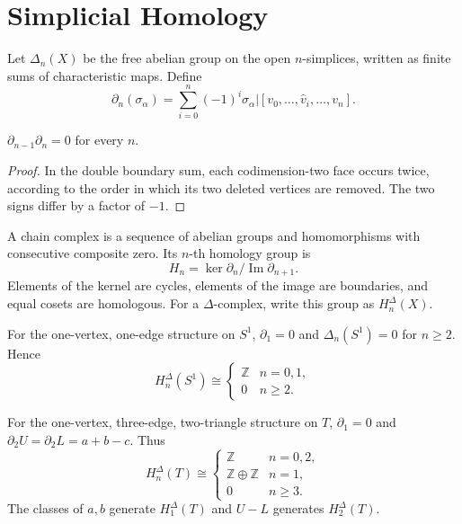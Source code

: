 \section*{Simplicial Homology}

Let $\Delta_n(X)$ be the free abelian group on the open $n$-simplices, written as finite sums of characteristic maps.  Define
\[
\partial_n(\sigma_\alpha)=\sum_{i=0}^n(-1)^i\sigma_\alpha|[v_0,\ldots,\widehat v_i,\ldots,v_n].
\]

\begin{lemma}
\label{lem:boundary-composition-zero}

$\partial_{n-1}\partial_n=0$ for every $n$.
\end{lemma}
\begin{proof}
\sketch In the double boundary sum, each codimension-two face occurs twice, according to the order in which its two deleted vertices are removed.  The two signs differ by a factor of $-1$.
\end{proof}

A chain complex is a sequence of abelian groups and homomorphisms with consecutive composite zero.  Its $n$-th homology group is
\[
H_n=\ker\partial_n/\operatorname{Im}\partial_{n+1}.
\]
Elements of the kernel are cycles, elements of the image are boundaries, and equal cosets are homologous.  For a $\Delta$-complex, write this group as $H_n^\Delta(X)$.

\begin{example}
\label{ex:simplicial-homology-circle}

For the one-vertex, one-edge structure on $S^1$, $\partial_1=0$ and $\Delta_n(S^1)=0$ for $n\geq2$.  Hence
\[
H_n^\Delta(S^1)\cong\begin{cases}\mathbb{Z}&n=0,1,\\0&n\geq2.\end{cases}
\]
\end{example}

\begin{example}
\label{ex:simplicial-homology-torus}

For the one-vertex, three-edge, two-triangle structure on $T$, $\partial_1=0$ and $\partial_2U=\partial_2L=a+b-c$.  Thus
\[
H_n^\Delta(T)\cong\begin{cases}\mathbb{Z}&n=0,2,\\\mathbb{Z}\oplus\mathbb{Z}&n=1,\\0&n\geq3.\end{cases}
\]
The classes of $a,b$ generate $H_1^\Delta(T)$ and $U-L$ generates $H_2^\Delta(T)$.
\end{example}

